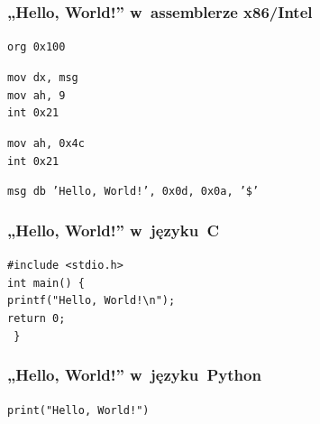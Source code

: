 \documentclass[10pt,t]{beamer}
\begin{document}
\begin{frame}
  \frametitle{„Hello, World!” w~assemblerze x86/Intel
    \parencite{Anonymous-Hello-World-in-x86-Assembly-Language}}


  \texttt{org 0x100} \\
  \vspace{0.8em}

  \texttt{mov dx, msg} \\
  \texttt{mov ah, 9} \\
  \texttt{int 0x21} \\
  \vspace{0.8em}

  \texttt{mov ah, 0x4c} \\
  \texttt{int 0x21} \\
  \vspace{0.8em}

  \texttt{msg db 'Hello, World!', 0x0d, 0x0a, '\$'}

\end{frame}





\begin{frame}
  \frametitle{„Hello, World!” w~języku~C}


  \texttt{\#include <stdio.h>} \\
  \vspace{0.8em}
  \texttt{int main() \{ } \\
  \hphantom{aaaa} \texttt{printf("Hello, World!\textbackslash n");} \\
  \vspace{0.8em}
  \vspace{0.8em}
  \vspace{0.8em}
  \vspace{0.8em}
  \hphantom{aaaa} \texttt{return 0;} \\
  \texttt{ \} }

\end{frame}





\begin{frame}
  \frametitle{„Hello, World!” w~języku~Python}


  \texttt{print("Hello, World!")}

\end{frame}
\end{document}
